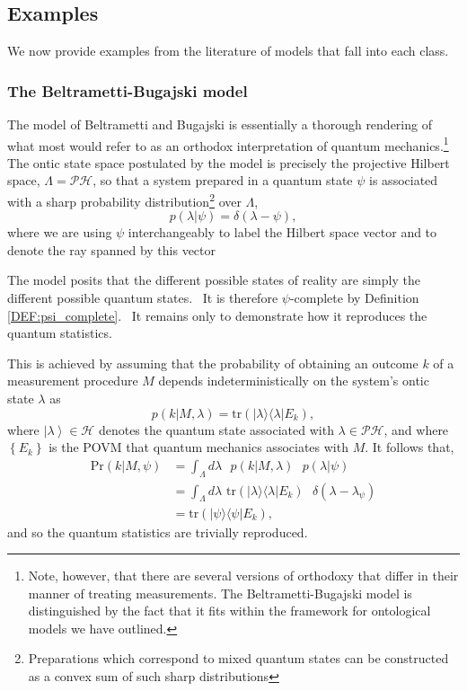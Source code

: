 \documentclass[aps,nofootinbib,12pt]{revtex4-2}
\begin{document}
\subsection{Examples \label{SEC:example_models}}

We now provide examples from the literature of models that fall into
each class.

\subsubsection{The Beltrametti-Bugajski model \label{SEC:example_bb}}

The model of Beltrametti and Bugajski \cite{beltrametti_bugajski} is
essentially a thorough rendering of what most would refer to as an
orthodox interpretation of quantum mechanics.\footnote{Note,
however, that there are several versions of orthodoxy that differ in
their manner of treating measurements. The Beltrametti-Bugajski
model is distinguished by the fact that it fits within the framework
for ontological models we have outlined.} The ontic state space
postulated by the model is precisely the projective Hilbert space,
$\Lambda=\mathcal{PH}$, so that a system prepared in a quantum state
$\psi$ is associated with a sharp probability
distribution\footnote{Preparations which correspond to mixed quantum
states can be constructed as a convex sum of such sharp
distributions} over $\Lambda$,
\begin{equation}
p\left(  \lambda|\psi\right)  =\delta\left(  \lambda-\psi\right),
\end{equation}
where we are using $\psi$ interchangeably to label the Hilbert space
vector and to denote the ray spanned by this vector

The model posits that the different possible states of reality are
simply the different possible quantum states. \ It is therefore
$\psi$-complete by Definition \ref{DEF:psi_complete}. \ It remains
only to demonstrate how it reproduces the quantum statistics.

This is achieved by assuming that the probability of obtaining an
outcome $k$ of a measurement procedure $M$ depends
indeterministically on the system's ontic state $\lambda$ as
\begin{equation}
p\left(  k|M,\lambda\right)  =\text{tr}\left(  |\lambda\rangle\langle
\lambda|E_{k}\right),\label{BB1}%
\end{equation}
where $\left\vert \lambda\right\rangle \in\mathcal{H}$ denotes the
quantum state associated with $\lambda\in\mathcal{PH}$, and where
$\left\{ E_{k}\right\}$ is the POVM that quantum mechanics
associates with $M$. It follows that,
\begin{align}
\mathrm{Pr}\left(  k|M,\psi\right)   &  =\int_{\Lambda}{d}\lambda\text{ }%
{p}\left(  k|M,\lambda\right)  \text{ }p(\lambda|\psi)\nonumber\\
&  =\int_{\Lambda}{d}\lambda\text{ tr}\left(  |\lambda\rangle\langle
\lambda|E_{k}\right)  \text{ }\delta\left(  \lambda-\lambda_{\psi}\right)
\label{BB2}\\
&  =\text{tr}\left(  |\psi\rangle\langle\psi|E_{k}\right),\label{BB3}%
\end{align}
and so the quantum statistics are trivially reproduced.
\end{document}
